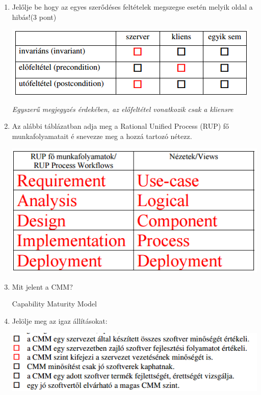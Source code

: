 \begin{enumerate}
		\item Jelőlje be hogy az egyes szerődéses feltételek megszegse esetén melyik oldal a hibás!(3 pont)

				\begin{center}
					\includegraphics[scale=0.7]{img/table1}
				\end{center}

			\small \textit{Egyszerű megjegyzés érdekében, az előfeltétel vonatkozik csak a kliensre} \normalsize

		\item Az alábbi táblázatban adja meg a Rational Unified Process (RUP) fő munkafolyamatait é snevezze meg a hozzá tartozó nétezz.

				\begin{center}
					\includegraphics[scale=0.7]{img/table2}
				\end{center}

	\item Mit jelent a CMM?

		Capability Maturity Model

	\item Jelölje meg az igaz állításokat:

				\begin{center}
					\includegraphics[scale=0.7]{img/table3}
				\end{center}


\end{enumerate}
